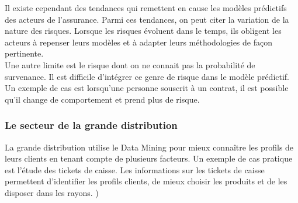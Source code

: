 \documentclass[11pt,a4paper]{report}
\begin{document}
 Il existe cependant des tendances qui remettent en cause les modèles prédictifs des acteurs de l'assurance. Parmi ces tendances, on peut citer la variation de la nature des risques. Lorsque les risques évoluent dans le temps, ils obligent les acteurs à repenser leurs modèles et à adapter leurs méthodologies de façon pertinente.\\  Une autre limite est le risque dont on ne connait pas la probabilité de survenance. Il est difficile d'intégrer ce genre de risque dans le modèle prédictif. Un exemple de cas est lorsqu'une personne souscrit à un contrat, il est possible qu'il change de comportement et prend plus de risque.  
  
%
%
 
   
%
%

 \subsubsection{Le secteur de la grande distribution}
 
 La grande distribution utilise le Data Mining  pour mieux connaître les profils de leurs clients en tenant compte de plusieurs facteurs. Un exemple de cas pratique est l'étude des tickets de caisse. Les informations sur les tickets de caisse permettent d'identifier les profils clients, de mieux choisir les produits et de les disposer dans les rayons. \cite{stephane})
\end{document}

